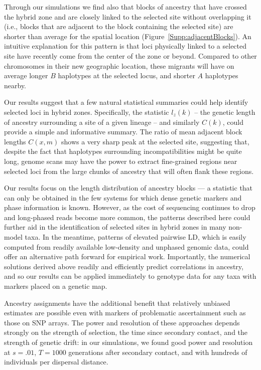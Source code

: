 \documentclass[11pt,letterpaper]{article}
\begin{document}
Through our simulations we find also that blocks of ancestry that have crossed the hybrid zone and are closely linked to the selected site without overlapping it (i.e., blocks that are adjacent to the block containing the selected site) are shorter than average for the spatial location (Figure~\ref{Supp:adjacentBlocks}). 
An intuitive explanation for this pattern is that loci physically linked to a selected site have recently come from the center of the zone or beyond. 
Compared to other chromosomes in their new geographic location, these migrants will have on average longer $B$ haplotypes at the selected locus, and shorter $A$ haplotypes nearby. 

Our results suggest that a few natural statistical summaries could help identify selected loci in hybrid zones. 
Specifically, the statistic $l_z(k)$ -- the genetic length of ancestry surrounding a site of a given lineage --  and similarly $C(k)$, could provide a simple and informative summary. 
The ratio of mean adjacent block lengths $C(x,m)$ shows a very sharp peak at the selected site,
suggesting that, despite the fact that haplotypes surrounding incompatibilities might be quite long, 
genome scans may have the power to extract fine-grained regions near selected loci from the large chunks of ancestry that will often flank these regions. 

Our results focus on the length distribution of ancestry blocks --- a statistic that can only be obtained in the few systems for which dense genetic markers and phase information is known. 
However, as the cost of sequencing continues to drop and long-phased reads become more common, the patterns described here could further aid in the identification of selected sites in hybrid zones in many non-model taxa. 
In the meantime, patterns of elevated pairwise LD, which is easily computed from readily available low-density and unphased genomic data, could offer an alternative path forward for empirical work. 
Importantly, the numerical solutions derived above readily and efficiently predict correlations in ancestry, and so our results can be applied immediately to genotype data for any taxa with markers placed on a genetic map.

Ancestry assignments have the additional benefit that relatively unbiased estimates are possible even with markers of problematic ascertainment
such as those on SNP arrays.
The power and resolution of these approaches depends strongly on the strength of selection,
the time since secondary contact,
and the strength of genetic drift:
in our simulations,
we found good power and resolution at $s=.01$, $T=1000$ generations after secondary contact,
and with hundreds of individuals per dispersal distance.
\end{document}
